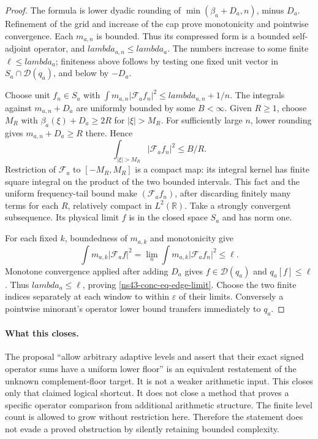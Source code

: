 \documentclass[11pt]{article}
\def\lambda{lambda}%
\theoremstyle{remark}
\begin{document}
\begin{proof}
The formula is lower dyadic rounding of
$\min(\beta_a+D_a,n)$, minus $D_a$. Refinement of the grid and
increase of the cap prove monotonicity and pointwise convergence.
Each $m_{a,n}$ is bounded. Thus its compressed form is a bounded
self-adjoint operator, and $\lambda_{a,n}\le\lambda_a$.
The numbers increase to some finite $\ell\le\lambda_a$; finiteness
above follows by testing one fixed unit vector in
$S_a\cap\mathcal D(q_a)$, and below by $-D_a$.

Choose unit $f_n\in S_a$ with
$\int m_{a,n}|\mathcal F_af_n|^2\le\lambda_{a,n}+1/n$.
The integrals against $m_{a,n}+D_a$ are uniformly bounded by some
$B<\infty$. Given $R\ge1$, choose $M_R$ with
$\beta_a(\xi)+D_a\ge2R$ for $|\xi|>M_R$.
For sufficiently large $n$, lower rounding gives
$m_{a,n}+D_a\ge R$ there. Hence
\[
 \int_{|\xi|>M_R}|\mathcal F_af_n|^2\le B/R.
\]
Restriction of $\mathcal F_a$ to $[-M_R,M_R]$ is a compact map:
its integral kernel has finite square integral on the product of
the two bounded intervals. This fact and the uniform frequency-tail
bound make $(\mathcal F_af_n)$, after discarding finitely many
terms for each $R$, relatively compact in $L^2(\mathbb R)$.
Take a strongly convergent subsequence. Its physical limit $f$ is
in the closed space $S_a$ and has norm one.

For each fixed $k$, boundedness of $m_{a,k}$ and monotonicity give
\[
 \int m_{a,k}|\mathcal F_af|^2
 =\lim_n\int m_{a,k}|\mathcal F_af_n|^2\le\ell.
\]
Monotone convergence applied after adding $D_a$ gives
$f\in\mathcal D(q_a)$ and $q_a[f]\le\ell$.
Thus $\lambda_a\le\ell$, proving \eqref{ns43-conc-eq-edge-limit}.
Choose the two finite indices separately at each window to within
$\varepsilon$ of their limits. Conversely a pointwise minorant's
operator lower bound transfers immediately to $q_a$.
\end{proof}

\paragraph{What this closes.}
The proposal ``allow arbitrary adaptive levels and assert that their
exact signed operator sums have a uniform lower floor'' is an
equivalent restatement of the unknown complement-floor target.
It is not a weaker arithmetic input. This closes only that claimed
logical shortcut. It does not close a method that proves a specific
operator comparison from additional arithmetic structure.
The finite level count is allowed to grow without restriction here.
Therefore the statement does not evade a proved obstruction by
silently retaining bounded complexity.
\end{document}
